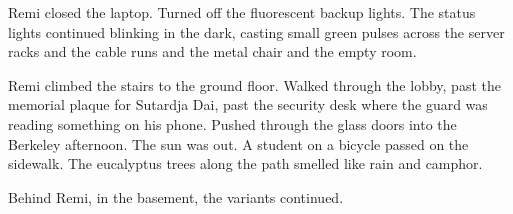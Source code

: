 Remi closed the laptop. Turned off the fluorescent backup lights. The status lights continued blinking in the dark, casting small green pulses across the server racks and the cable runs and the metal chair and the empty room.

Remi climbed the stairs to the ground floor. Walked through the lobby, past the memorial plaque for Sutardja Dai, past the security desk where the guard was reading something on his phone. Pushed through the glass doors into the Berkeley afternoon. The sun was out. A student on a bicycle passed on the sidewalk. The eucalyptus trees along the path smelled like rain and camphor.

Behind Remi, in the basement, the variants continued.

